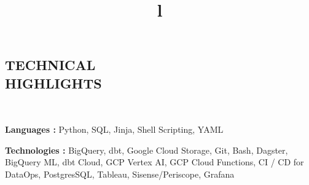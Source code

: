 \documentclass[margin]{res}
\begin{document}
\begin{resume}

\section{TECHNICAL\\HIGHLIGHTS}\

\textbf{Languages :} Python, SQL, Jinja, Shell Scripting, YAML

\textbf{Technologies :} BigQuery, dbt, Google Cloud Storage, Git, Bash, Dagster, BigQuery ML, dbt Cloud, GCP Vertex AI, GCP Cloud Functions, CI / CD for DataOps, PostgresSQL, Tableau, Sisense/Periscope, Grafana

\\
\begin{format}
\title{l}\\
\\
\body\\
\end{format}






\end{resume}
\end{document}
